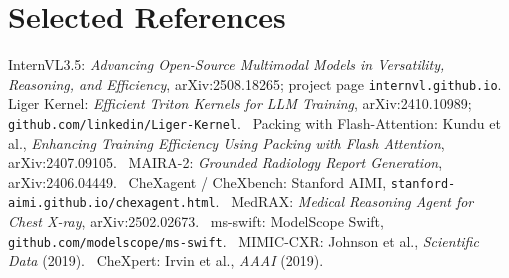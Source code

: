 \documentclass[11pt,a4paper]{article}
\begin{document}
\section{Selected References}
\label{app:refs}
{\footnotesize
InternVL3.5: \emph{Advancing Open-Source Multimodal Models in Versatility, Reasoning, and Efficiency}, arXiv:2508.18265; project page \texttt{internvl.github.io}. \,
Liger Kernel: \emph{Efficient Triton Kernels for LLM Training}, arXiv:2410.10989; \texttt{github.com/linkedin/Liger-Kernel}. \,
Packing with Flash-Attention: Kundu et al., \emph{Enhancing Training Efficiency Using Packing with Flash Attention}, arXiv:2407.09105. \,
MAIRA-2: \emph{Grounded Radiology Report Generation}, arXiv:2406.04449. \,
CheXagent / CheXbench: Stanford AIMI, \texttt{stanford-aimi.github.io/chexagent.html}. \,
MedRAX: \emph{Medical Reasoning Agent for Chest X-ray}, arXiv:2502.02673. \,
ms-swift: ModelScope Swift, \texttt{github.com/modelscope/ms-swift}. \,
MIMIC-CXR: Johnson et al., \emph{Scientific Data} (2019). \,
CheXpert: Irvin et al., \emph{AAAI} (2019).
}
\end{document}
